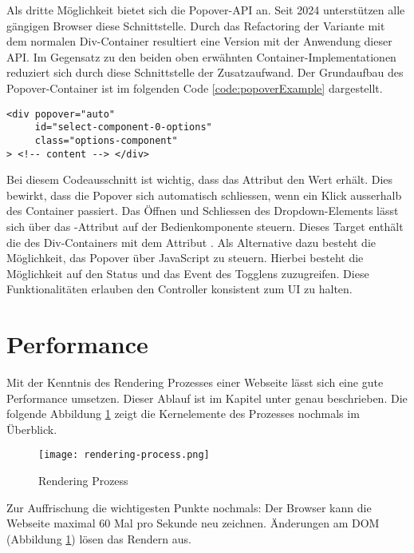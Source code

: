 Als dritte Möglichkeit bietet sich die Popover-API an. 
Seit 2024 unterstützen alle gängigen Browser diese Schnittstelle. 
Durch das Refactoring der Variante mit dem normalen Div-Container resultiert eine Version mit der Anwendung dieser API. 
Im Gegensatz zu den beiden oben erwähnten Container-Implementationen reduziert sich durch diese Schnittstelle der Zusatzaufwand. 
Der Grundaufbau des Popover-Container ist im folgenden Code \ref{code:popoverExample} dargestellt. 

\begin{lstlisting}[style = htmlcssjs, caption = Popover-Container Beispiel, label = code:popoverExample]
<div popover="auto"
     id="select-component-0-options" 
     class="options-component" 
> <!-- content --> </div>
\end{lstlisting}

Bei diesem Codeausschnitt ist wichtig, dass das Attribut  den Wert  erhält. 
Dies bewirkt, dass die Popover sich automatisch schliessen, wenn ein Klick ausserhalb des Container passiert. 
Das Öffnen und Schliessen des Dropdown-Elements lässt sich über das -Attribut auf der Bedienkomponente steuern. 
Dieses Target enthält die  des Div-Containers mit dem Attribut . 
Als Alternative dazu besteht die Möglichkeit, das Popover über JavaScript zu steuern. 
Hierbei besteht die Möglichkeit auf den Status und das Event des Togglens zuzugreifen. 
Diese Funktionalitäten erlauben den Controller konsistent zum UI zu halten. 


\section{Performance}
\label{sec:performance}

Mit der Kenntnis des Rendering Prozesses einer Webseite lässt sich eine gute Performance umsetzen. 
Dieser Ablauf ist im Kapitel \textbf{} unter \textbf{} genau beschrieben. 
Die folgende Abbildung \ref{img:renderingProcessRecap} zeigt die Kernelemente des Prozesses nochmals im Überblick. 

\begin{figure}[!htb]
    \centering
    \texttt{[image: rendering-process.png]}
    \caption{\centering Rendering Prozess}
    \label{img:renderingProcessRecap}
\end{figure}

Zur Auffrischung die wichtigesten Punkte nochmals: 
Der Browser kann die Webseite maximal 60 Mal pro Sekunde neu zeichnen. 
Änderungen am DOM (Abbildung \ref{img:renderingProcessRecap}) lösen das Rendern aus. 

